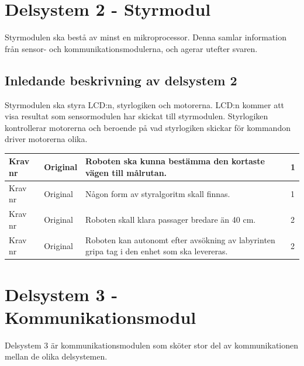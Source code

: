 \documentclass[11pt]{article}
\newcounter{kravc}
\newcommand{\kravcc}{
	\thekravc
	\stepcounter{kravc}
}
\begin{document}
\begin{flushleft}
\begin{center}
\begin{longtable}{|l|l|p{.70\linewidth}|l|}
\end{longtable}
\end{center}


\section{Delsystem 2 - Styrmodul}
Styrmodulen ska bestå av minst en mikroprocessor.  Denna samlar information från sensor- och kommunikationsmodulerna, och agerar utefter svaren.


\subsection{Inledande beskrivning av delsystem 2}
Styrmodulen ska styra LCD:n, styrlogiken och motorerna.
LCD:n kommer att visa resultat som sensormodulen har skickat till styrmodulen. Styrlogiken kontrollerar motorerna och beroende på vad styrlogiken skickar för kommandon driver motorerna olika.

\begin{center}
\begin{longtable}{|l|l|p{.70\linewidth}|l|} \hline

Krav nr\kravcc &
Original &
Roboten ska kunna bestämma den kortaste vägen till målrutan. &
1 \\ \hline

Krav nr\kravcc &
Original &
Någon form av styralgoritm skall finnas. &
1 \\ \hline

Krav nr\kravcc &
Original &
Roboten skall klara passager bredare än 40 cm. &
2 \\ \hline

Krav nr\kravcc &
Original &
Roboten kan autonomt efter avsökning av labyrinten gripa tag i den enhet som ska levereras. &
2 \\ \hline

\end{longtable}
\end{center}


\pagebreak

\section{Delsystem 3 - Kommunikationsmodul}
Delsystem 3 är kommunikationsmodulen som sköter stor del av kommunikationen mellan de olika delsystemen. 
\begin{center}
\begin{longtable}{|l|l|p{.70\linewidth}|l|} \hline


\end{longtable}
\end{center}
\end{flushleft}
\end{document}
